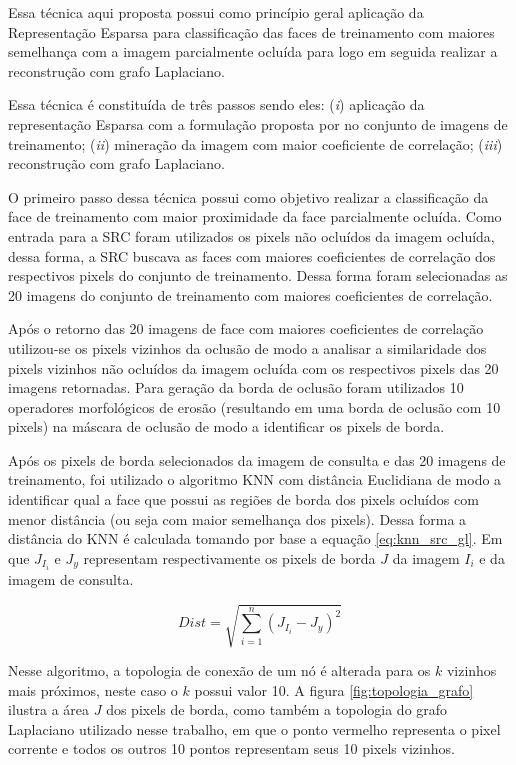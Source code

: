 Essa técnica aqui proposta possui como princípio geral aplicação da Representação Esparsa para classificação das faces de treinamento com maiores semelhança com a imagem parcialmente ocluída para logo em seguida realizar a reconstrução com grafo Laplaciano.

Essa técnica é constituída de três passos sendo eles: (\textit{i}) aplicação da representação Esparsa com a formulação proposta por  no conjunto de imagens de treinamento; (\textit{ii}) mineração da imagem com maior coeficiente de correlação; (\textit{iii}) reconstrução com grafo Laplaciano.


O primeiro passo dessa técnica possui como objetivo realizar a classificação da face de treinamento com maior proximidade da face parcialmente ocluída. Como entrada para a SRC foram utilizados os pixels não ocluídos da imagem ocluída, dessa forma, a SRC buscava as faces com maiores coeficientes de correlação dos respectivos pixels do conjunto de treinamento. Dessa forma foram selecionadas as 20 imagens do conjunto de treinamento com maiores coeficientes de correlação.

Após o retorno das 20 imagens de face com maiores coeficientes de correlação utilizou-se os pixels vizinhos da oclusão de modo a analisar a similaridade dos pixels vizinhos não ocluídos da imagem ocluída com os respectivos pixels das 20 imagens retornadas. Para geração da borda de oclusão foram utilizados 10 operadores morfológicos de erosão (resultando em uma borda de oclusão com 10 pixels) na máscara de oclusão de modo a identificar os pixels de borda. 

Após os pixels de borda selecionados da imagem de consulta e das 20 imagens de treinamento, foi utilizado o algoritmo KNN com distância Euclidiana de modo a identificar qual a face que possui as regiões de borda dos pixels ocluídos com menor distância (ou seja com maior semelhança dos pixels). Dessa forma a distância do KNN é calculada tomando por base a equação \ref{eq:knn_src_gl}. Em que $J_{I_i}$ e $J_y$ representam respectivamente os pixels de borda $J$ da imagem $I_i$ e da imagem de consulta.

\begin{equation}
Dist = \sqrt{\sum_{i=1}^{n} (J_{I_i} - J_y)^2 }
\label{eq:knn_src_gl}
\end{equation}

Nesse algoritmo, a topologia de conexão de um nó é alterada para os $k$ vizinhos mais próximos, neste caso o $k$ possui valor 10. A figura \ref{fig:topologia_grafo} ilustra a área $J$ dos pixels de borda, como também a topologia do grafo Laplaciano utilizado nesse trabalho, em que o ponto vermelho representa o pixel corrente e todos os outros 10 pontos representam seus 10 pixels vizinhos.


